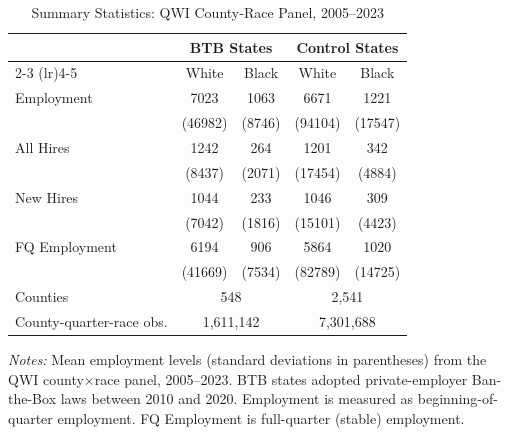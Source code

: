 \begin{table}[htbp]
\centering
\caption{Summary Statistics: QWI County-Race Panel, 2005--2023}
\label{tab:summary}
\begin{tabular}{lcccc}
\hline\hline
 & \multicolumn{2}{c}{BTB States} & \multicolumn{2}{c}{Control States} \\
\cmidrule(lr){2-3} \cmidrule(lr){4-5}
 & White & Black & White & Black \\
\hline
Employment & 7023 & 1063 & 6671 & 1221 \\
 & (46982) & (8746) & (94104) & (17547) \\
All Hires & 1242 & 264 & 1201 & 342 \\
 & (8437) & (2071) & (17454) & (4884) \\
New Hires & 1044 & 233 & 1046 & 309 \\
 & (7042) & (1816) & (15101) & (4423) \\
FQ Employment & 6194 & 906 & 5864 & 1020 \\
 & (41669) & (7534) & (82789) & (14725) \\
\hline
Counties & \multicolumn{2}{c}{548} & \multicolumn{2}{c}{2,541} \\
County-quarter-race obs. & \multicolumn{2}{c}{1,611,142} & \multicolumn{2}{c}{7,301,688} \\
\hline\hline
\end{tabular}
\begin{tablenotes}[flushleft]\footnotesize
\item \textit{Notes:} Mean employment levels (standard deviations in parentheses) from the QWI county$\times$race panel, 2005--2023. BTB states adopted private-employer Ban-the-Box laws between 2010 and 2020. Employment is measured as beginning-of-quarter employment. FQ Employment is full-quarter (stable) employment.
\end{tablenotes}
\end{table}
